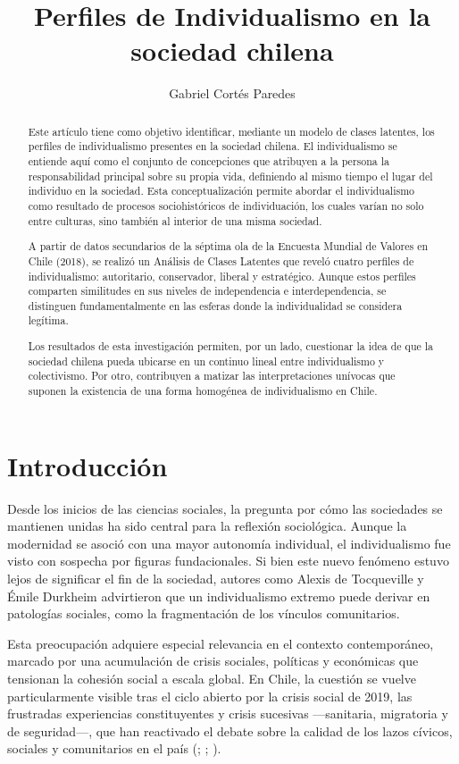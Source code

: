 \documentclass[
  12pt,
  letterpaper,
  DIV=11,
  numbers=noendperiod]{scrartcl}
\title{Perfiles de Individualismo en la sociedad chilena}
\author{Gabriel Cortés Paredes}
\date{}
\begin{document}
\maketitle
\begin{abstract}
Este artículo tiene como objetivo identificar, mediante un modelo de
clases latentes, los perfiles de individualismo presentes en la sociedad
chilena. El individualismo se entiende aquí como el conjunto de
concepciones que atribuyen a la persona la responsabilidad principal
sobre su propia vida, definiendo al mismo tiempo el lugar del individuo
en la sociedad. Esta conceptualización permite abordar el individualismo
como resultado de procesos sociohistóricos de individuación, los cuales
varían no solo entre culturas, sino también al interior de una misma
sociedad.

A partir de datos secundarios de la séptima ola de la Encuesta Mundial
de Valores en Chile (2018), se realizó un Análisis de Clases Latentes
que reveló cuatro perfiles de individualismo: autoritario, conservador,
liberal y estratégico. Aunque estos perfiles comparten similitudes en
sus niveles de independencia e interdependencia, se distinguen
fundamentalmente en las esferas donde la individualidad se considera
legítima.

Los resultados de esta investigación permiten, por un lado, cuestionar
la idea de que la sociedad chilena pueda ubicarse en un continuo lineal
entre individualismo y colectivismo. Por otro, contribuyen a matizar las
interpretaciones unívocas que suponen la existencia de una forma
homogénea de individualismo en Chile.
\end{abstract}


\section{Introducción}\label{introducciuxf3n}

Desde los inicios de las ciencias sociales, la pregunta por cómo las
sociedades se mantienen unidas ha sido central para la reflexión
sociológica. Aunque la modernidad se asoció con una mayor autonomía
individual, el individualismo fue visto con sospecha por figuras
fundacionales. Si bien este nuevo fenómeno estuvo lejos de significar el
fin de la sociedad, autores como Alexis de Tocqueville y Émile Durkheim
advirtieron que un individualismo extremo puede derivar en patologías
sociales, como la fragmentación de los vínculos comunitarios.

Esta preocupación adquiere especial relevancia en el contexto
contemporáneo, marcado por una acumulación de crisis sociales, políticas
y económicas que tensionan la cohesión social a escala global. En Chile,
la cuestión se vuelve particularmente visible tras el ciclo abierto por
la crisis social de 2019, las frustradas experiencias constituyentes y
crisis sucesivas ---sanitaria, migratoria y de seguridad---, que han
reactivado el debate sobre la calidad de los lazos cívicos, sociales y
comunitarios en el país (; ;
).
\end{document}
